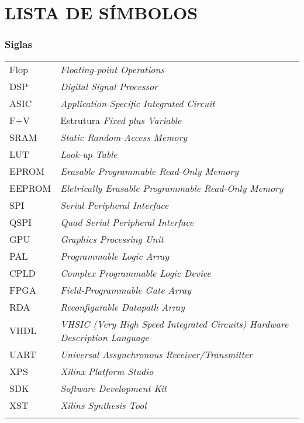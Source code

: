                       

\chapter*{LISTA DE SÍMBOLOS} %

\subsection*{Siglas}
\begin{tabular}{p{}p{}}
Flop & \textit{Floating-point Operations}\\
DSP & \textit{Digital Signal Processor}\\
ASIC & \textit{Application-Specific Integrated Circuit}\\
F+V & Estrutura \textit{Fixed plus Variable}\\
SRAM & \textit{Static Random-Access Memory}\\
LUT & \textit{Look-up Table}\\
EPROM & \textit{Erasable Programmable Read-Only Memory}\\
EEPROM & \textit{Eletrically Erasable Programmable Read-Only Memory}\\
SPI & \textit{Serial Peripheral Interface}\\
QSPI & \textit{Quad Serial Peripheral Interface}\\
GPU & \textit{Graphics Processing Unit}\\
PAL & \textit{Programmable Logic Array}\\
CPLD & \textit{Complex Programmable Logic Device}\\
FPGA & \textit{Field-Programmable Gate Array}\\
RDA & \textit{Reconfigurable Datapath Array}\\
VHDL & \textit{VHSIC (Very High Speed Integrated Circuits) Hardware Description Language}\\
UART & \textit{Universal Assynchronous Receiver/Transmitter}\\
XPS & \textit{Xilinx Platform Studio}\\
SDK & \textit{Software Development Kit}\\
XST & \textit{Xilins Synthesis Tool}\\
& \textit{}\\
\end{tabular}

